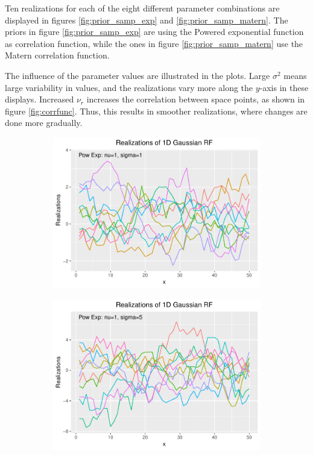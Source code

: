 Ten realizations for each of the eight different parameter combinations are displayed in figures \ref{fig:prior_samp_exp} and \ref{fig:prior_samp_matern}. The priors in figure \ref{fig:prior_samp_exp} are using the Powered exponential function as correlation function, while the ones in figure \ref{fig:prior_samp_matern} use the Matern correlation function.

The influence of the parameter values are illustrated in the plots. Large $\sigma^2$ means large variability in values, and the realizations vary more along the $y$-axis in these displays. Increased $\nu_r$ increases the correlation between space points, as shown in figure \ref{fig:corrfunc}. Thus, this results in smoother realizations, where changes are done more gradually.

\begin{figure}[]
\centering
    \begin{subfigure}[H]{0.49\textwidth}
        \centering
        \includegraphics[scale=0.5,trim=0cm 0cm 0cm 0cm]{figures/sample1conf1.pdf}
    \end{subfigure}
    \hfill
    \begin{subfigure}[H]{0.49\textwidth}  
        \centering 
        \includegraphics[scale=0.5,trim=0cm 0cm 0cm 0cm]{figures/sample1conf2.pdf}
    \end{subfigure}


\end{figure}
